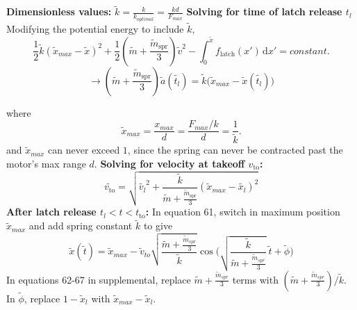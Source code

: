 \documentclass[12pt]{article}
\begin{document}
\noindent \textbf{Dimensionless values:} 
\newline
$\tilde{k} = \frac{k}{k_{optimal}} = \frac{kd}{F_{max}}$
\newline
\newline
\noindent \textbf{Solving for time of latch release $t_l$}
\newline
Modifying the potential energy to include $\tilde{k}$,
\[
    \frac{1}{2}\tilde{k}(\tilde{x}_{max}-\tilde{x})^2 + \frac{1}{2}\left(\tilde{m} + \frac{\tilde{m}_{\text{spr}}}{3} \right)\tilde{v}^2 - \int_0^{\tilde{x}} \! f_{\text{latch}}(x') \, \mathrm{d}x' = constant. 
\]
\[
    \rightarrow \left(\tilde{m} + \frac{\tilde{m}_{\text{spr}}}{3} \right)\tilde{a}(\tilde{t_l}) = \tilde{k} \biggl( \tilde{x}_{max} - \tilde{x}(\tilde{t_l}) \biggr)
\]

where 
\[
    \tilde{x}_{max} = \frac{x_{max}}{d} = \frac{F_{max} / k}{d} = \frac{1}{\tilde{k}}.
\]
and $\tilde{x}_{max}$ can never exceed $1$, since the spring can never be contracted past the motor's max range $d$.
\newline 
\newline
\noindent \textbf{Solving for velocity at takeoff $v_{\text{to}}$:}
\newline
\[
    \tilde{v_{\text{to}}} = \sqrt{\tilde{v_l}^2 + \frac{\tilde{k}}{\tilde{m} + \frac{\tilde{m}_{\text{spr}}}{3}} (\tilde{x}_{max} - \tilde{x_l})^2}
\]
\newline 
\newline
\noindent \textbf{After latch release $t_l < t < t_{\text{to}}$:}
\newline
In equation 61, switch in maximum position $\tilde{x}_{max}$ and add spring constant $\tilde{k}$ to give
\[
    \tilde{x}(\tilde{t}) = \tilde{x}_{max} - \tilde{v}_{to} \sqrt{\frac{\tilde{m} + \frac{\tilde{m}_{spr}}{3}}{\tilde{k}}} \cos{\biggl(\sqrt{\frac{\tilde{k}}{\tilde{m} + \frac{\tilde{m}_{spr}}{3}}} \ \tilde{t} + \tilde{\phi} \biggr)} \]
In equations 62-67 in supplemental, replace $\tilde{m} + \frac{\tilde{m}_{spr}}{3}$ terms with $(\tilde{m} + \frac{\tilde{m}_{spr}}{3}) / \tilde{k}$. In $\tilde{\phi}$, replace $1 - \tilde{x}_l$ with $\tilde{x}_{max} - \tilde{x}_l$.
\newline
\end{document}
